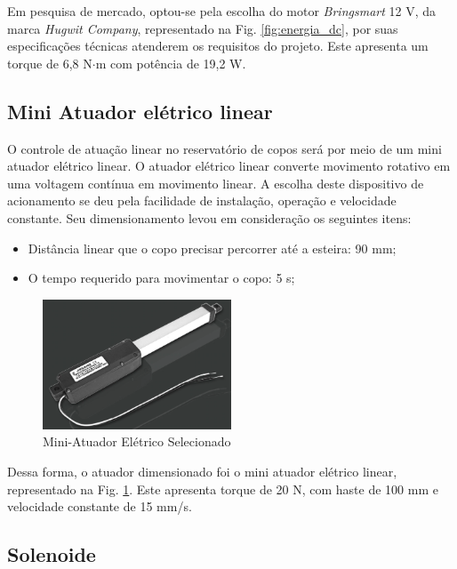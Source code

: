 Em pesquisa de mercado, optou-se pela escolha do motor \emph{Bringsmart} 12 V, da marca \emph{Hugwit Company}, representado na Fig. \ref{fig:energia_dc}, por suas especificações técnicas atenderem os requisitos do projeto. Este apresenta um torque de 6,8 N$\cdot$m com potência de 19,2 W. 
 
\subsection{Mini Atuador elétrico linear}\label{energ:atuador_linear}

O controle de atuação linear no reservatório de copos será por meio de um mini atuador elétrico linear. O atuador elétrico linear converte movimento rotativo em uma voltagem contínua em movimento linear. A escolha deste dispositivo de acionamento se deu pela facilidade de instalação, operação e velocidade constante. Seu dimensionamento levou em consideração os seguintes itens:

\begin{itemize}
    \item Distância linear que o copo precisar percorrer até a esteira: 90 mm;
    \item O tempo requerido para movimentar o copo: 5 s;
\end{itemize}

\begin{figure}[H]
\centering
    \includegraphics[width=0.5\textwidth]{figuras/energia/fotos_componentes/Energia_atuador.png}
    \caption{Mini-Atuador Elétrico Selecionado}
    \label{fig:energia_atuador}
\end{figure}


Dessa forma, o atuador dimensionado foi o mini atuador elétrico linear, representado na Fig. \ref{fig:energia_atuador}. Este apresenta torque de 20 N, com haste de 100 mm e velocidade constante de 15 mm/s.

\subsection{Solenoide}\label{energ:solenoide}

